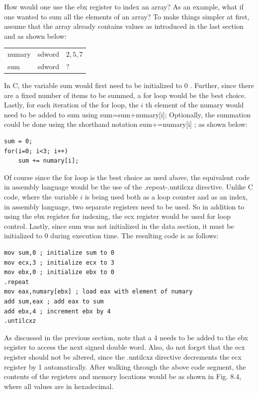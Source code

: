 \documentclass[10pt]{book}
\begin{document}
How would one use the ebx register to index an array? As an example, what if one wanted to sum all the elements of an array? To make things simpler at first, assume that the array already contains values as introduced in the last section and as shown below:

\begin{center}
\begin{tabular}{lll}
numary & sdword & $2,5,7$ \\
sum & sdword & $?$ \\
\end{tabular}
\end{center}

In C, the variable sum would first need to be initialized to 0 . Further, since there are a fixed number of items to be summed, a for loop would be the best choice. Lastly, for each iteration of the for loop, the $i$ th element of the numary would need to be added to sum using sum=sum+numary[i]; Optionally, the summation could be done using the shorthand notation sum+=numary[i] ; as shown below:

\begin{verbatim}
sum = 0;
for(i=0; i<3; i++)
    sum += numary[i];
\end{verbatim}

Of course since the for loop is the best choice as used above, the equivalent code in assembly language would be the use of the .repeat-.untilcxz directive. Unlike C code, where the variable $i$ is being used both as a loop counter and as an index, in assembly language, two separate registers need to be used. So in addition to using the ebx register for indexing, the ecx register would be used for loop control. Lastly, since sum was not initialized in the data section, it must be initialized to 0 during execution time. The resulting code is as follows:
\begin{verbatim}
mov sum,0 ; initialize sum to 0
mov ecx,3 ; initialize ecx to 3
mov ebx,0 ; initialize ebx to 0
.repeat
mov eax,numary[ebx] ; load eax with element of numary
add sum,eax ; add eax to sum
add ebx,4 ; increment ebx by 4
.untilcxz
\end{verbatim}

As discussed in the previous section, note that a 4 needs to be added to the ebx register to access the next signed double word. Also, do not forget that the ecx register should not be altered, since the .untilcxz directive decrements the ecx register by 1 automatically. After walking through the above code segment, the contents of the registers and memory locations would be as shown in Fig. 8.4, where all values are in hexadecimal.
\end{document}
